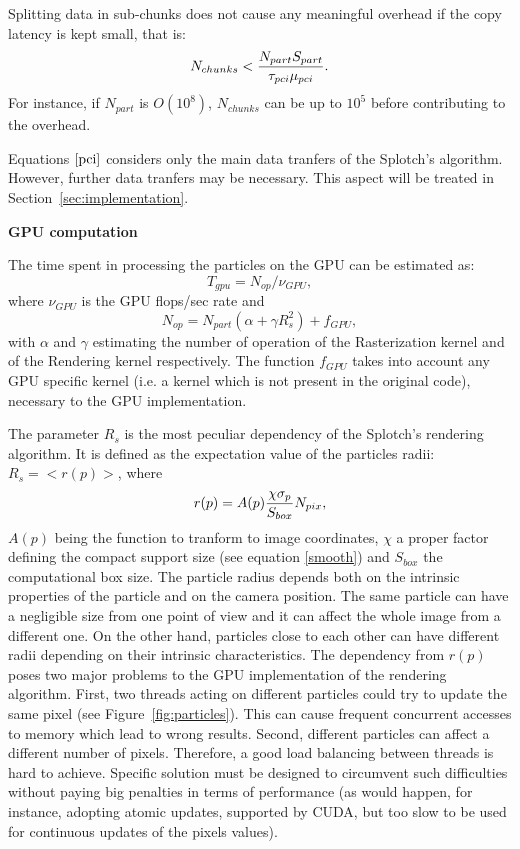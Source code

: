 \documentclass[11pt]{article}
\begin{document}
Splitting data in sub-chunks does not
cause any meaningful overhead if the copy latency is kept small, that is:
\begin{equation}
N_{chunks} < {N_{part} S_{part}\over \tau_{pci}\mu_{pci}}.
\end{equation}
For instance, if $N_{part}$ is $O(10^8)$, $N_{chunks}$ can be up to $10^5$ before
contributing to the overhead.

Equations $\eqref{pci}$ considers only the main data tranfers of
the Splotch's algorithm. However, further data tranfers may be necessary.
This aspect will be treated in Section~\ref{sec:implementation}.

\medskip
\noindent
{\bf GPU computation}

\noindent
The time spent in processing the particles on the GPU can be estimated as:
\begin{equation}
T_{gpu} = N_{op}/\nu_{GPU},
\end{equation}
where $\nu_{GPU}$ is the GPU flops/sec rate and
\begin{equation}\label{ops}
N_{op} = N_{part}(\alpha + \gamma R_s^2) + f_{GPU},
\end{equation}
with $\alpha$ and $\gamma$ estimating the number of operation of 
the Rasterization kernel  
and of the Rendering kernel respectively. The function 
$f_{GPU}$ takes into account any GPU specific kernel (i.e. a kernel
which is not present in the original code), necessary to the GPU implementation. 

The parameter $R_s$ is the most peculiar dependency of the Splotch's rendering
algorithm. It is defined as the expectation value of the particles radii:
$R_s = <r(p)>$, where
\begin{equation}\label{radius}
r(p) = A(p){\chi \sigma_p\over S_{box}} N_{pix},
\end{equation} 
$A(p)$ being the function to tranform to image coordinates,
$\chi$ a proper factor defining the compact support size (see  
equation \eqref{smooth}) and $S_{box}$ the computational box size.
The particle radius depends both on the intrinsic properties of the particle
and on the camera position. The same particle can have a negligible size
from one point of view and it can affect the whole image from a different one.
On the other hand, particles close to each other can have different radii depending
on their intrinsic characteristics. The dependency from $r(p)$ poses 
two major problems to the GPU implementation of the rendering 
algorithm. First, two threads acting on different particles could try 
to update the same pixel (see Figure~\ref{fig:particles}).
This can cause frequent concurrent accesses to memory
which lead to wrong results. 
Second, different particles can affect a different number of pixels. Therefore, a good load balancing
between threads is hard to achieve.  
Specific solution must be designed to circumvent such difficulties 
without paying big penalties in terms of performance (as would happen, for instance,
adopting atomic updates, supported by CUDA, but too slow to be used for continuous 
updates of the pixels values).
\end{document}
